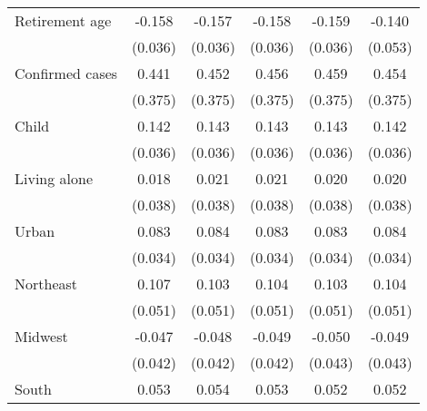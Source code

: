 {\begin{tabular}{l*{5}{c}}
\addlinespace
Retirement age      &      -0.158\sym{***}&      -0.157\sym{***}&      -0.158\sym{***}&      -0.159\sym{***}&      -0.140\sym{***}\\
                    &     (0.036)         &     (0.036)         &     (0.036)         &     (0.036)         &     (0.053)         \\
\addlinespace
Confirmed cases     &       0.441         &       0.452         &       0.456         &       0.459         &       0.454         \\
                    &     (0.375)         &     (0.375)         &     (0.375)         &     (0.375)         &     (0.375)         \\
\addlinespace
Child               &       0.142\sym{***}&       0.143\sym{***}&       0.143\sym{***}&       0.143\sym{***}&       0.142\sym{***}\\
                    &     (0.036)         &     (0.036)         &     (0.036)         &     (0.036)         &     (0.036)         \\
\addlinespace
Living alone        &       0.018         &       0.021         &       0.021         &       0.020         &       0.020         \\
                    &     (0.038)         &     (0.038)         &     (0.038)         &     (0.038)         &     (0.038)         \\
\addlinespace
Urban               &       0.083\sym{**} &       0.084\sym{**} &       0.083\sym{**} &       0.083\sym{**} &       0.084\sym{**} \\
                    &     (0.034)         &     (0.034)         &     (0.034)         &     (0.034)         &     (0.034)         \\
\addlinespace
Northeast           &       0.107\sym{**} &       0.103\sym{**} &       0.104\sym{**} &       0.103\sym{**} &       0.104\sym{**} \\
                    &     (0.051)         &     (0.051)         &     (0.051)         &     (0.051)         &     (0.051)         \\
\addlinespace
Midwest             &      -0.047         &      -0.048         &      -0.049         &      -0.050         &      -0.049         \\
                    &     (0.042)         &     (0.042)         &     (0.042)         &     (0.043)         &     (0.043)         \\
\addlinespace
South               &       0.053         &       0.054         &       0.053         &       0.052         &       0.052         \\

\end{tabular}}
